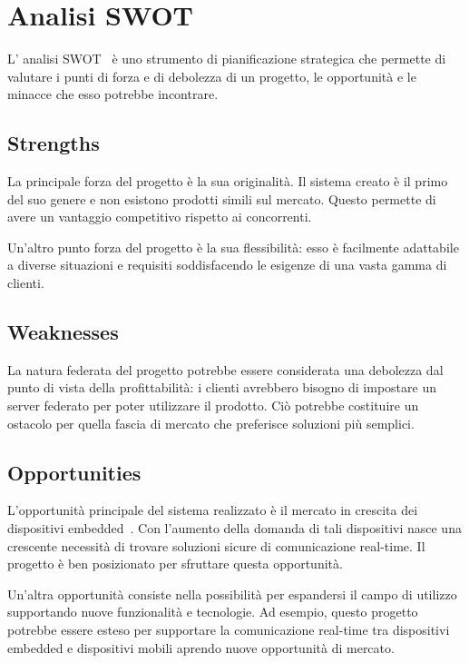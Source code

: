 \chapter{Analisi SWOT}

L' analisi SWOT~\cite{barile2019analisi} è uno strumento di pianificazione strategica che permette di valutare i punti di forza
e di debolezza di un progetto, le opportunità e le minacce che esso potrebbe incontrare.

\section{Strengths}

La principale forza del progetto è la sua originalità. Il sistema creato è il primo del suo genere e non esistono
prodotti simili sul mercato. Questo permette di avere un vantaggio competitivo rispetto ai concorrenti.

Un'altro punto forza del progetto è la sua flessibilità: esso è facilmente
adattabile a diverse situazioni e requisiti soddisfacendo le esigenze di una vasta gamma
di clienti.

\section{Weaknesses}

La natura federata del progetto potrebbe essere considerata una debolezza dal punto di vista della profittabilità:
i clienti avrebbero bisogno di impostare un server federato per poter utilizzare il prodotto. Ciò potrebbe costituire
un ostacolo per quella fascia di mercato che preferisce soluzioni più semplici.

\section{Opportunities}

L'opportunità principale del sistema realizzato è il mercato in crescita dei dispositivi embedded~\cite{al2020internet}. Con l'aumento
della domanda di tali dispositivi nasce una crescente necessità di trovare soluzioni sicure di comunicazione real-time. 
Il progetto è ben posizionato per sfruttare questa opportunità.

Un'altra opportunità consiste nella possibilità per espandersi il campo di utilizzo supportando nuove funzionalità e
tecnologie. Ad esempio, questo progetto potrebbe essere esteso per supportare la comunicazione real-time
tra dispositivi embedded e dispositivi mobili aprendo nuove opportunità di mercato.

